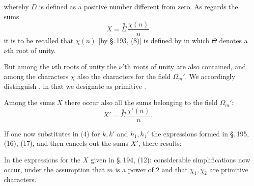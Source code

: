 
whereby $D$ is defined as a positive number different from zero.
As regards the sums
\[
X = \overset{n}{\Sigma}\, \frac{\chi(n)}{n}
\]
it is to be recalled that $\chi(n)$ [by \S.\,193, (8)] is defined by
in which $\Theta$ denotes a $\nu$th root of unity.

But among the $\nu$th roots of unity the $\nu'$th roots of unity are
also contained, and among the characters $\chi$ also the characters for
the field $\Omega_m'$. We accordingly distinguish , in that we designate as
primitive .

Among the sums $X$ there occur also all the sums belonging to the field
$\Omega_m'$:
\[
X' = \overset{n}{\Sigma}\, \frac{\chi'(n)}{n}.
\]

If one now substitutes in (4) for $k, k'$ and $h_1, h_1'$ the
expressions formed in \S.\,195, (16), (17), and then cancels out the
sums $X'$, there results:

In the expressions for the $X$ given in \S.\,194, (12):
considerable simplifications now occur, under the assumption that $m$ is
a power of 2 and that $\chi_1, \chi_2$ are primitive characters.
